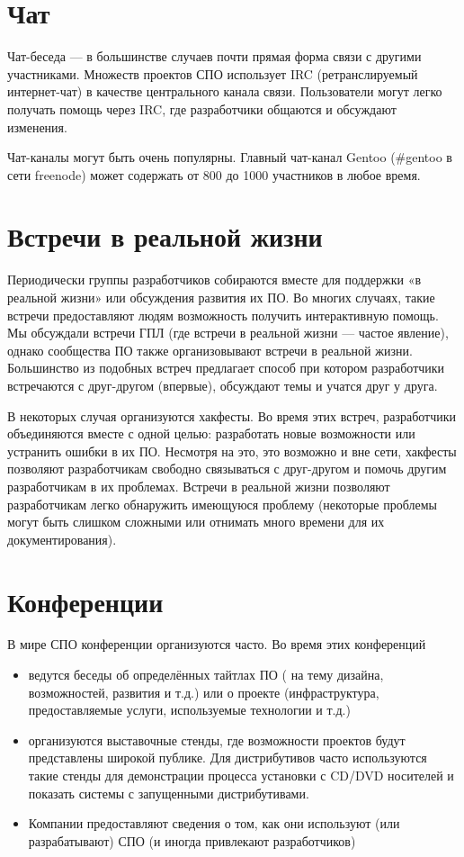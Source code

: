 \documentclass[10pt]{book}
\begin{document}
\section{Чат}

Чат-беседа — в большинстве случаев почти прямая форма связи с другими участниками. Множеств проектов СПО использует IRC (ретранслируемый интернет-чат) в качестве центрального канала связи. Пользователи могут легко получать помощь через IRC, где разработчики общаются и обсуждают изменения.

Чат-каналы могут быть очень популярны. Главный чат-канал Gentoo (\#gentoo в сети freenode) может содержать от 800 до 1000 участников в любое время.

\section{Встречи в реальной жизни}

Периодически группы разработчиков собираются вместе для поддержки «в реальной жизни» или обсуждения развития их ПО. Во многих случаях, такие встречи предоставляют людям возможность получить интерактивную помощь. Мы обсуждали встречи ГПЛ (где встречи в реальной жизни — частое явление), однако сообщества ПО также организовывают встречи в реальной жизни. Большинство из подобных встреч предлагает способ при котором разработчики встречаются с друг-другом (впервые), обсуждают темы и учатся друг у друга.

В некоторых случая организуются хакфесты. Во время этих встреч, разработчики объединяются вместе с одной целью: разработать новые возможности или устранить ошибки в их ПО. Несмотря на это, это возможно и вне сети, хакфесты позволяют разработчикам свободно связываться с друг-другом и помочь другим разработчикам в их проблемах. Встречи в реальной жизни позволяют разработчикам легко обнаружить имеющуюся проблему (некоторые проблемы могут быть слишком сложными или отнимать много времени для их документирования).

\section{Конференции}

В мире СПО конференции организуются часто. Во время этих конференций

\begin{itemize}
	\item ведутся беседы об определённых тайтлах ПО ( на тему дизайна, возможностей, развития и т.д.) или о проекте (инфраструктура, предоставляемые услуги, используемые технологии и т.д.)
	\item организуются выставочные стенды, где возможности проектов будут представлены широкой публике. Для дистрибутивов часто используются такие стенды для демонстрации процесса установки с CD/DVD носителей и показать системы с запущенными дистрибутивами.
	\item Компании предоставляют сведения о том, как они используют (или разрабатывают) СПО (и иногда привлекают разработчиков)
\end{itemize}
\end{document}
